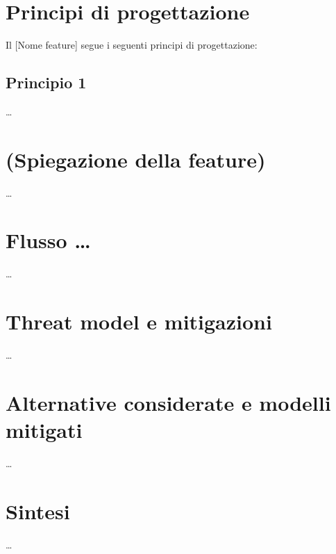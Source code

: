 \documentclass[a4paper,11pt,table,dvipsnames]{article}
\begin{document}
\section{Principi di progettazione}
Il [Nome feature] segue i seguenti principi di progettazione:

\subsection{Principio 1}
\dots

\section{(Spiegazione della feature)}
\dots

\section{Flusso \dots}
\dots

\section{Threat model e mitigazioni}
\dots

\section{Alternative considerate e modelli mitigati}
\dots

\section{Sintesi}
\dots
\end{document}
